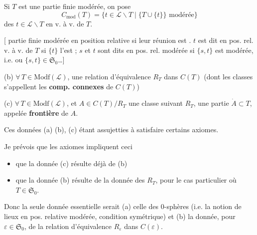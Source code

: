 \documentclass[11pt,a4paper]{article}
\begin{document}
Si $T$ est une partie finie modérée, on  pose
\[
  C_{\mathrm{mod}}(T) = \{t \in \mathcal{L} \smallsetminus T \mid \{T \cup \{t\}\} \text{ modérée}\}
\]
\ill{} des $t \in \mathcal{L} \smallsetminus T$ en \ill{} v. à v. de $T$.

[\ill{} partie finie modérée \ill{} en position relative \ill{} si leur réunion est \ill{}. $t$ est dit en pos. rel. \ill{} v. à v. de $T$ si $\{t\}$ l'est ; $s$ et $t$ sont dits en pos. rel. modérée si $\{s,t\}$ est modérée, i.e.   ou $\{s,t\} \in \mathfrak{S}_0$…]


(b) $\forall\, T \in \mathrm{Modf}(\mathcal{L})$, une relation d'équivalence $R_T$ dans $C(T)$ (dont les classes s'appellent les \textbf{comp. connexes} de $C(T)$)

(c) $\forall\, T \in \mathrm{Modf}(\mathcal{L})$, et $A \in C(T)/R_T$ une classe suivant $R_T$, une partie $\dot{A} \subset T$, appelée \textbf{frontière} de $A$.

Ces données (a) (b), (c) étant assujetties à satisfaire certains axiomes.

Je prévois que les axiomes impliquent  ceci
\begin{itemize}
  \item[1°)] que la donnée (c) résulte déjà de (b)
  \item[2°)] que la donnée (b) résulte de la donnée des $R_T$, pour le cas particulier où $T \in \mathfrak{S}_0$.
\end{itemize}
Donc la seule donnée essentielle serait (a) celle des 0-sphères (i.e. la notion de  lieux en pos. relative modérée, condition  symétrique) et (b) la donnée, pour $\varepsilon \in \mathfrak{S}_0$, de la relation d'équivalence $R_\varepsilon$ dans $C(\varepsilon)$.
\end{document}
